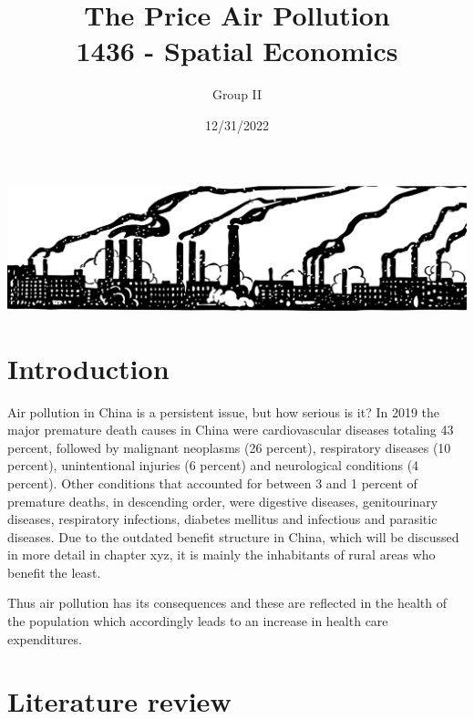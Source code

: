 \documentclass[
]{article}
\title{The Price Air Pollution\\
1436 - Spatial Economics}
\author{Group II}
\date{12/31/2022}
\begin{document}
\maketitle

\begin{center}
\includegraphics[width = 380pt]{pollution.png} 
\end{center}
\thispagestyle{empty}
\begin{abstract}
	
\end{abstract}
\newpage
{}

\hypertarget{introduction}{%
\section{Introduction}\label{introduction}}
Air pollution in China is a persistent issue, but how serious is it? 
In 2019 the major premature death causes in China were cardiovascular diseases totaling 43 percent, followed by malignant neoplasms (26 percent), respiratory diseases (10 percent), unintentional injuries (6 percent) and neurological conditions (4 percent). Other conditions that accounted for between 3 and 1 percent of premature deaths, in descending order, were digestive diseases, genitourinary diseases, respiratory infections, diabetes mellitus and infectious and parasitic diseases. %
Due to the outdated benefit structure in China, which will be discussed in more detail in chapter xyz, it is mainly the inhabitants of rural areas who benefit the least. 

Thus air pollution has its consequences and these are reflected in the health of the population which accordingly leads to an increase in health care  expenditures. 







\hypertarget{literature review}{%
\section{Literature review}\label{Literature review}}
\end{document}
